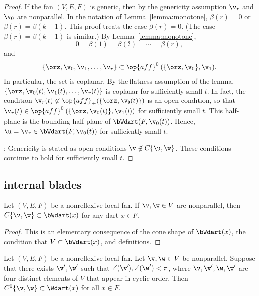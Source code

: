 \begin{proof}
If the fan $(V,E,F)$ is generic, then
by the genericity assumption $\v_r$ and
$\v_0$ are nonparallel.  In the notation of
Lemma~\ref{lemma:monotone}, $\beta(r) = 0$ or $\beta(r) =
\beta(k-1)$.  This proof treats the case $\beta(r)=0$. (The case
$\beta(r)=\beta(k-1)$ is similar.)  By Lemma~\ref{lemma:monotone},
\[ 0=\beta(1)=\beta(2)=\cdots=\beta(r),\] 
and 
\[ 
\{\orz,\v_0,\v_1,\ldots,\v_r\} \subset \op{aff}^0_+(\{\orz,\v_0\},\v_1).
\] 
In particular, the set is coplanar.  By the flatness assumption of
the lemma, $\{\orz,\v_0(t),\v_1(t),\ldots,\v_r(t)\}$ is coplanar for
sufficiently small $t$.  In fact, the condition $\v_r(t)\not\in
\op{aff}_+(\{\orz,\v_0(t)\})$ is an open condition, so that
$\v_r(t)\in \op{aff}^0_+(\{\orz,\v_0(t)\},\v_1(t))$ for sufficiently
small $t$.  This half-plane is the bounding half-plane of
$\bWdart(F,\v_0(t))$.  Hence, $\u = \v_r\in \bWdart(F,\v_0(t))$ for
sufficiently small $t$.

: Genericity is stated as open conditions $\v\not\in
C\{\u,\w\}$.  These conditions continue to hold for sufficiently small
$t$.
\end{proof}




\subsection{internal blades}


\begin{lemma}[]
Let $(V,E,F)$ be a nonreflexive local fan.
If $\v,\w\in V$ are nonparallel, then $C\{\v,\w\} \subset
\bWdart(x)$ for any dart $x\in F$.
\end{lemma}
%

\begin{proof} This is an elementary consequence of
the cone shape of $\bWdart(x)$,  the condition that $V\subset
\bWdart(x)$, and definitions.
\end{proof}


\begin{lemma} \label{lemma:internal}
Let $(V,E,F)$ be a nonreflexive local fan.  Let $\v,\w\in V$ be nonparallel.
Suppose that there exists $\v',\w'$ such that
$\angle(\v'),\angle(\w')<\pi$, where $\v,\v',\w,\w'$ are four
distinct elements of $V$ that appear in cyclic order.  Then
$C^0\{\v,\w\}\subset \Wdart(x)$ for all $x\in F$.
\end{lemma}
%
%

